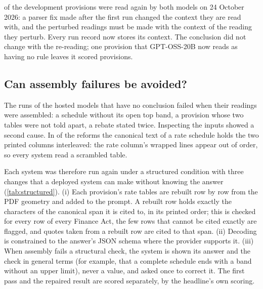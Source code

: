 \documentclass[sn-apa]{sn-jnl}
\begin{document}
 of the development provisions were
read again by both models on 24 October 2026: a parser fix made after the
first run changed the context they are read with, and the perturbed
readings must be made with the context of the reading they perturb. Every
run record now stores its context. The conclusion did not change with the
re-reading; one provision that GPT-OSS-20B now reads as having no rule
leaves it  scored provisions.



\subsection{Can assembly failures be avoided?}\label{sec:structured}


The runs of the hosted models that have no conclusion failed when their
readings were assembled: a schedule without its open top band, a provision
whose two tables were not told apart, a rebate stated twice. Inspecting the inputs showed a second
cause. In  of the  reforms the
canonical text of a rate schedule holds the two printed columns interleaved:
the rate column's wrapped lines appear out of order, so every system read a
scrambled table.

Each system was therefore run again under a structured condition with three
changes that a deployed system can make without knowing the answer
(\cref{tab:structured}). (i) Each provision's rate tables are rebuilt row by
row from the PDF geometry and added to the prompt. A rebuilt row holds
exactly the characters of the canonical span it is cited to, in its printed
order; this is checked for every row of every Finance Act, the few rows that
cannot be cited exactly are flagged, and quotes taken from a rebuilt row are
cited to that span. (ii) Decoding is constrained to
the answer's JSON schema where the provider supports it. (iii) When assembly
fails a structural check, the system is shown its answer and the check in
general terms (for example, that a complete schedule ends with a band
without an upper limit), never a value, and asked once to correct it. The
first pass and the repaired result are scored separately, by the headline's
own scoring.
\end{document}
